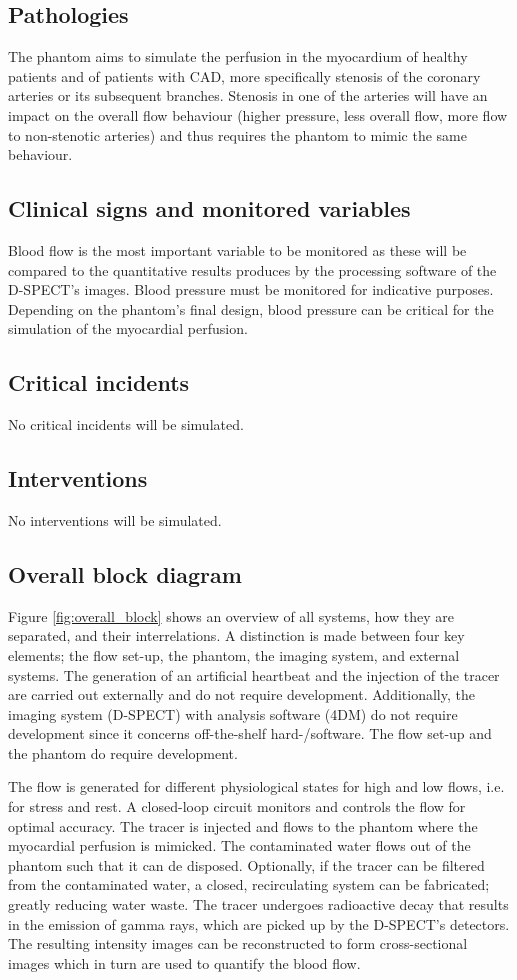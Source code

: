\subsection{Pathologies}
The phantom aims to simulate the perfusion in the myocardium of healthy patients and of patients with \ac{CAD}, more specifically stenosis of the coronary arteries or its subsequent branches. Stenosis in one of the arteries will have an impact on the overall flow behaviour (higher pressure, less overall flow, more flow to non-stenotic arteries) and thus requires the phantom to mimic the same behaviour.
\subsection{Clinical signs and monitored variables}
Blood flow is the most important variable to be monitored as these will be compared to the quantitative results produces by the processing software of the D-SPECT's images. Blood pressure must be monitored for indicative purposes. Depending on the phantom's final design, blood pressure can be critical for the simulation of the myocardial perfusion.
\subsection{Critical incidents}
No critical incidents will be simulated.
\subsection{Interventions}
No interventions will be simulated.
\subsection{Overall block diagram}
Figure \ref{fig:overall_block} shows an overview of all systems, how they are separated, and their interrelations. A distinction is made between four key elements; the flow set-up, the phantom, the imaging system, and external systems. The generation of an artificial heartbeat and the injection of the tracer are carried out externally and do not require development. Additionally, the imaging system (D-SPECT) with analysis software (4DM) do not require development since it concerns off-the-shelf hard-/software. The flow set-up and the phantom do require development. 

The flow is generated for different physiological states for high and low flows, i.e. for stress and rest. A closed-loop circuit monitors and controls the flow for optimal accuracy. The tracer is injected and flows to the phantom where the myocardial perfusion is mimicked. The contaminated water flows out of the phantom such that it can de disposed. Optionally, if the tracer can be filtered from the contaminated water, a closed, recirculating system can be fabricated; greatly reducing water waste. The tracer undergoes radioactive decay that results in the emission of gamma rays, which are picked up by the D-SPECT's detectors. The resulting intensity images can be reconstructed to form cross-sectional images which in turn are used to quantify the blood flow.

